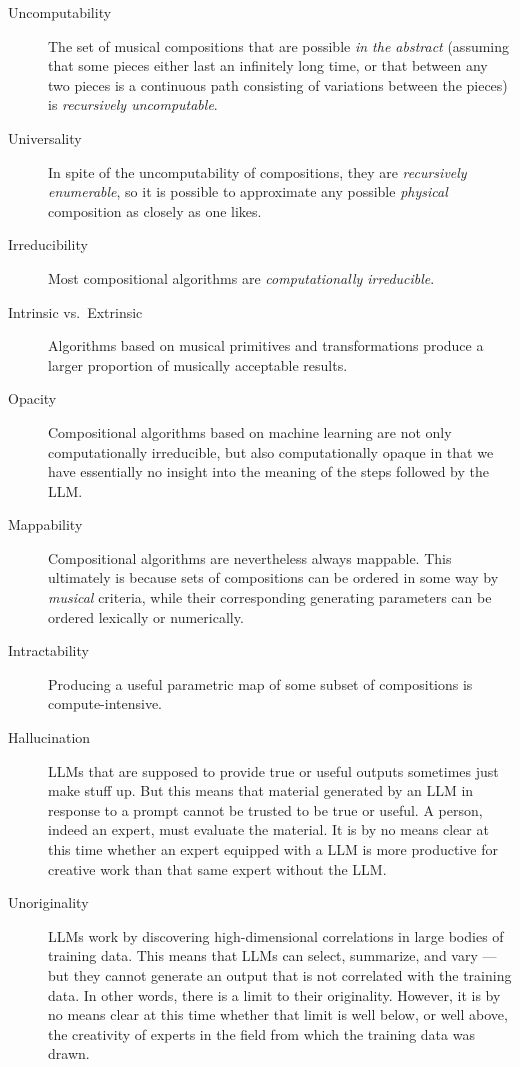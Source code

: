 \documentclass[11pt,papersize=a4]{scrartcl}
\begin{document}
\begin{description}
\item[Uncomputability] The set of musical compositions that are possible \emph{in the abstract} (assuming that some pieces either last an infinitely long time, or that between any two pieces is a continuous path consisting of variations between the pieces) is \emph{recursively uncomputable}.
\item[Universality] In spite of the uncomputability of compositions, they are \emph{recursively enumerable}, so it is possible to approximate any possible \emph{physical} composition as closely as one likes.
\item[Irreducibility] Most compositional algorithms are \emph{computationally irreducible}.
\item[Intrinsic vs.\ Extrinsic] Algorithms based on musical primitives and transformations produce a larger proportion of musically acceptable results.
\item[Opacity] Compositional algorithms based on machine learning are not only computationally irreducible, but also computationally opaque in that we have essentially no insight into the meaning of the steps followed by the LLM.
\item[Mappability] Compositional algorithms are nevertheless always mappable. This ultimately is because sets of compositions can be ordered in some way by \emph{musical} criteria, while their corresponding generating parameters can be ordered lexically or numerically.
\item[Intractability] Producing a useful parametric map of some subset of compositions is compute-intensive. 
\item[Hallucination] LLMs that are supposed to provide true or useful outputs sometimes just make stuff up. But this means that material generated by an LLM in response to a prompt cannot be trusted to be true or useful. A person, indeed an expert, must evaluate the material. It is by no means clear at this time whether an expert equipped with a LLM is more productive for creative work than that same expert without the LLM.
\item[Unoriginality] LLMs work by discovering high-dimensional correlations in large bodies of training data. This means that LLMs can select, summarize, and vary --- but they cannot generate an output that is not correlated with the training data. In other words, there is a limit to their originality. However, it is by no means clear at this time whether that limit is well below, or well above, the creativity of experts in the field from which the training data was drawn.
\end{description}
\end{document}
